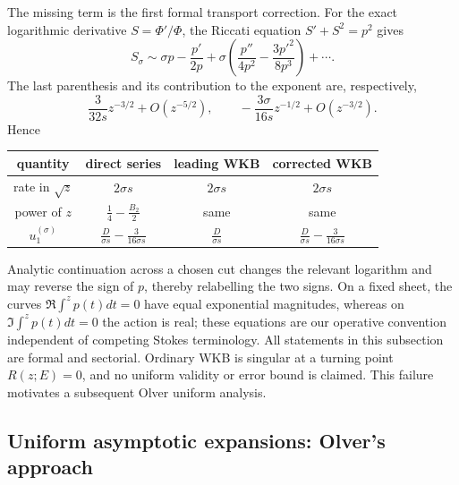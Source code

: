 \documentclass[11pt]{article}
\theoremstyle{remark}
\begin{document}
The missing term is the first formal transport correction.  For the exact
logarithmic derivative \(S=\Phi'/\Phi\), the Riccati equation
\(S'+S^2=p^2\) gives
\begin{equation}
 S_\sigma\sim \sigma p-\frac{p'}{2p}
 +\sigma\left(\frac{p''}{4p^2}-\frac{3p'^2}{8p^3}\right)+\cdots.
 \label{eq:lg-riccati-transport}
\end{equation}
The last parenthesis and its contribution to the exponent are, respectively,
\begin{equation}
 \frac{3}{32s}z^{-3/2}+O(z^{-5/2}),
 \qquad -\frac{3\sigma}{16s}z^{-1/2}+O(z^{-3/2}).
\end{equation}
Hence
\begin{center}
\begin{tabular}{c|c|c|c}
 quantity & direct series & leading WKB & corrected WKB\\ \hline
 rate in \(\sqrt z\) & \(2\sigma s\) & \(2\sigma s\) & \(2\sigma s\)\\
 power of \(z\) & \(\frac14-\frac{B_2}{2}\) & same & same\\
 \(u_1^{(\sigma)}\) & \(\frac{D}{\sigma s}-\frac{3}{16\sigma s}\)
 & \(\frac{D}{\sigma s}\)
 & \(\frac{D}{\sigma s}-\frac{3}{16\sigma s}\)
\end{tabular}
\end{center}

Analytic continuation across a chosen cut changes the relevant logarithm and
may reverse the sign of \(p\), thereby relabelling the two signs.  On a fixed
sheet, the curves \(\Re\int^z p(t)dt=0\) have equal exponential magnitudes,
whereas on \(\Im\int^z p(t)dt=0\) the action is real; these equations are our
operative convention independent of competing Stokes terminology.  All
statements in this subsection are formal and sectorial.  Ordinary WKB is
singular at a turning point \(R(z;E)=0\), and no uniform validity or error
bound is claimed.  This failure motivates a subsequent Olver uniform
analysis.

\subsection{Uniform asymptotic expansions: Olver's approach}
\label{subsec:olver-uniform}
\end{document}
